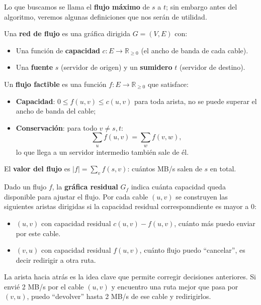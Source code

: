 Lo que buscamos se llama el \textbf{flujo máximo} de $s$ a $t$; sin embargo antes del algoritmo, veremos algunas definiciones que nos serán de utilidad.
\begin{definition}
Una \textbf{red de flujo} es una gráfica dirigida $G = (V, E)$ con:
\begin{itemize}
    \item Una función de \textbf{capacidad} $c: E \to \mathbb{R}_{\geq 0}$
          (el ancho de banda de cada cable).
    \item Una \textbf{fuente} $s$ (servidor de origen) y un
          \textbf{sumidero} $t$ (servidor de destino).
\end{itemize}
Un \textbf{flujo factible} es una función $f: E \to \mathbb{R}_{\geq 0}$
que satisface:
\begin{itemize}
    \item \textbf{Capacidad}: $0 \leq f(u,v) \leq c(u,v)$ para toda
          arista, no se puede superar el ancho de banda del cable;
    \item \textbf{Conservación}: para todo $v \neq s, t$:
          \[
          \sum_{u} f(u,v) = \sum_{w} f(v,w),
          \]
          lo que llega a un servidor intermedio también sale de él.
\end{itemize}
El \textbf{valor del flujo} es $|f| = \sum_v f(s,v)$: cuántos MB/s
salen de $s$ en total.
\end{definition}
 
\begin{definition}
Dado un flujo $f$, la \textbf{gráfica residual} $G_f$ indica cuánta
capacidad queda disponible para ajustar el flujo. Por cada cable
$(u,v)$ se construyen las siguientes aristas dirigidas si la capacidad residual corresponndiente es mayor a $0$:
\begin{itemize}
    \item $(u,v)$ con capacidad residual $c(u,v) - f(u,v)$, cuánto más puedo enviar por este cable.
    \item $(v,u)$ con capacidad residual $f(u,v)$, cuánto flujo puedo ``cancelar'', es decir redirigir a otra ruta.
\end{itemize}
\end{definition}
 
La arista hacia atrás es la idea clave que permite corregir decisiones
anteriores. Si envié 2 MB/s por el cable $(u,v)$ y encuentro una ruta
mejor que pasa por $(v,u)$, puedo ``devolver'' hasta 2 MB/s de ese
cable y redirigirlos.

